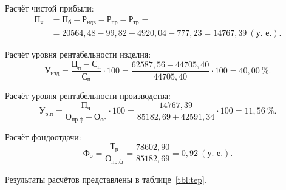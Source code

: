 Расчёт чистой прибыли:
\begin{align*}
  \text{П}_{\text{ч}} &= \text{П}_{\text{б}} - 
  \text{Р}_{\text{ндв}} - \text{Р}_{\text{пр}}  - \text{Р}_{\text{тр}} = \\
  &= 20564{,}48 - 99{,}82 - 4920{,}04 - 777{,}23 =
  14767{,}39 \: (\text{у.~е.}).
\end{align*}

Расчёт уровня рентабельности изделия:
\begin{equation*}
  \text{У}_{\text{изд}} = 
  \dfrac{\text{Ц}_{\text{п}} - \text{С}_{\text{п}}}{\text{С}_{\text{п}}} \cdot 100 =
  \dfrac{62587{,}56 - 44705{,}40}{44705{,}40} \cdot 100 =
  40{,}00 \: \%. 
\end{equation*}

Расчёт уровня рентабельности производства:
\begin{equation*}
  \text{У}_{\text{р.п}} = 
  \dfrac{\text{П}_{\text{ч}}}{\text{О}_{\text{пр.ф}} + \text{О}_{\text{ос}}} \cdot 100 =
  \dfrac{14767{,}39}{85182{,}69 + 42591{,}34} \cdot 100 =
  11{,}56 \: \%. 
\end{equation*}

Расчёт фондоотдачи:
\begin{equation*}
  \text{Ф}_{\text{о}} = 
  \dfrac{\text{Т}_{\text{р}}}{\text{О}_{\text{пр.ф}}} =
  \dfrac{78602{,}90}{85182{,}69} =
  0{,}92 \: (\text{у.~е.}). 
\end{equation*}

Результаты расчётов представлены в таблице~\ref{tbl:tep}.

